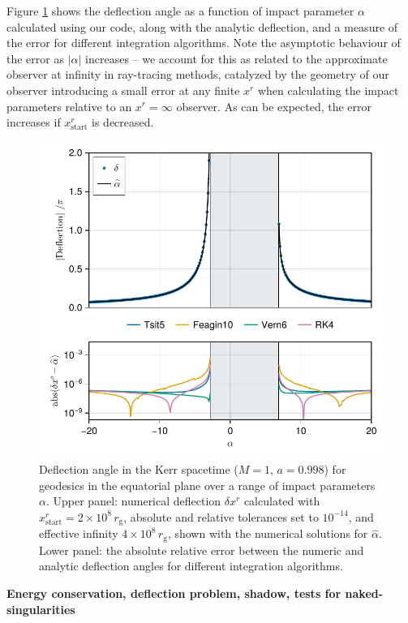 \documentclass[fleqn,usenatbib]{mnras}
\newcommand{\todo}[1]{{\bf \color{red} #1}}
\newcommand{\rg}{r_\text{g}}
\begin{document}
Figure \ref{fig:deflection-angle} shows the deflection angle as a function of impact parameter $\alpha$ calculated using our code, along with the analytic deflection, and a measure of the error for different integration algorithms. Note the asymptotic behaviour of the error as $\lvert \alpha \rvert$ increases -- we account for this as related to the approximate observer at infinity in ray-tracing methods, catalyzed by the geometry of our observer introducing a small error at any finite $x^r$ when calculating the impact parameters relative to an $x^r = \infty$ observer. As can be expected, the error increases if $x^r_\text{start}$ is decreased.

\begin{figure}
	\centering
	\includegraphics[width=0.94\linewidth]{figures/deflection.iyer-hansen.pdf}
	\caption{Deflection angle in the Kerr spacetime ($M = 1$, $a = 0.998$) for geodesics in the equatorial plane over a range of impact parameters $\alpha$. Upper panel: numerical deflection $\delta x^r$ calculated with  $x^r_\text{start} = 2 \times 10^8 \, \rg$, absolute and relative tolerances set to $10^{-14}$, and effective infinity $4 \times 10^8\, \rg$, shown with the numerical solutions for $\hat{\alpha}$. Lower panel: the absolute relative error between the numeric and analytic deflection angles for different integration algorithms.}
	\label{fig:deflection-angle}
\end{figure}


\todo{Energy conservation, deflection problem, shadow, tests for naked-singularities}
\end{document}
